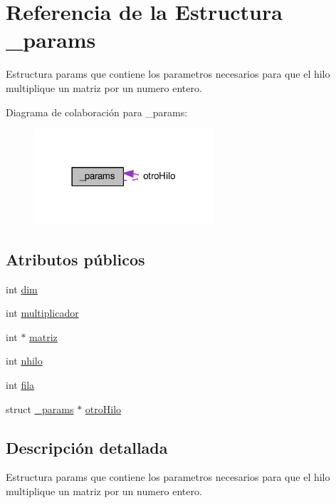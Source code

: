 \hypertarget{struct__params}{}\section{Referencia de la Estructura \+\_\+params}
\label{struct__params}


Estructura params que contiene los parametros necesarios para que el hilo multiplique un matriz por un numero entero.  




Diagrama de colaboración para \+\_\+params\+:\nopagebreak
\begin{figure}[H]
\begin{center}
\leavevmode
\includegraphics[width=189pt]{struct__params__coll__graph}
\end{center}
\end{figure}
\subsection*{Atributos públicos}
\begin{DoxyCompactItemize}
\item 
int \hyperlink{struct__params_aecffef63bfeb1c33b37bd5df12a98401}{dim}
\item 
int \hyperlink{struct__params_a142e538b8c88b8748ad390b6a86fe17d}{multiplicador}
\item 
int $\ast$ \hyperlink{struct__params_a04b3f21e1f7c21b17a510c2a4ee0e552}{matriz}
\item 
int \hyperlink{struct__params_a160a4d501715e51cfa0a2f289b6c5b14}{nhilo}
\item 
int \hyperlink{struct__params_a8ebf07d62261f18feb39cad26d027616}{fila}
\item 
struct \hyperlink{struct__params}{\+\_\+params} $\ast$ \hyperlink{struct__params_a21ba0961d6fcfa8c876ba58142d181be}{otro\+Hilo}
\end{DoxyCompactItemize}


\subsection{Descripción detallada}
Estructura params que contiene los parametros necesarios para que el hilo multiplique un matriz por un numero entero. 

